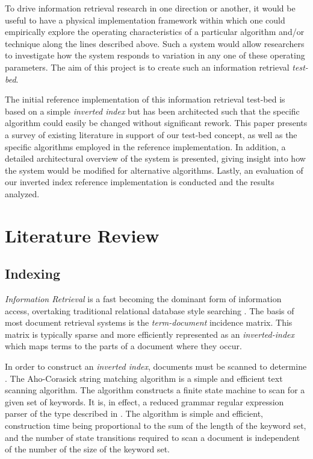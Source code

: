 \documentclass[10pt]{report}
\begin{document}
To drive information retrieval research in one direction or another,
it would be useful to have a physical implementation
framework within which one could empirically explore the operating
characteristics of a particular algorithm and/or technique along the lines
described above. Such a system would allow researchers to investigate
how the system responds to variation in any one of these operating
parameters. The aim of this project is to create such an
information retrieval \textit{test-bed}.

The initial reference implementation of this information retrieval
test-bed is based on a simple \textit{inverted index} but has been
architected such that the specific algorithm could easily be changed
without significant rework. This paper presents a survey of existing
literature in support of our test-bed concept, as well as the specific
algorithms employed in the reference implementation. In
addition, a detailed architectural overview of the system is
presented, giving insight into how the system would be modified for
alternative algorithms. Lastly, an evaluation of our inverted index
reference implementation is conducted and the results analyzed.


\section{Literature Review}
\label{sec:literaturereview}


\subsection{Indexing}
\textit{Information Retrieval} is a fast becoming the dominant form of
information access, overtaking traditional relational database style
searching \cite{RefWorks:109}. The basis of most document retrieval
systems is the \textit{term-document} incidence matrix. This matrix is
typically sparse and more efficiently represented as an
\textit{inverted-index} which maps terms to the parts of a document
where they occur. 

In order to construct an \textit{inverted index}, documents must be
scanned to determine . The Aho-Corasick
string matching algorithm\cite{RefWorks:103} is a simple and efficient
text scanning algorithm. The algorithm constructs a finite
state machine to scan for a given set of keywords. It is, in effect, a
reduced grammar regular expression parser of the type described in
\cite{RefWorks:111}. The algorithm is simple and efficient,
construction time being proportional to the sum of the length of the
keyword set, and the number of state transitions required to scan a
document is independent of the number of the size of the keyword
set. 
\end{document}
